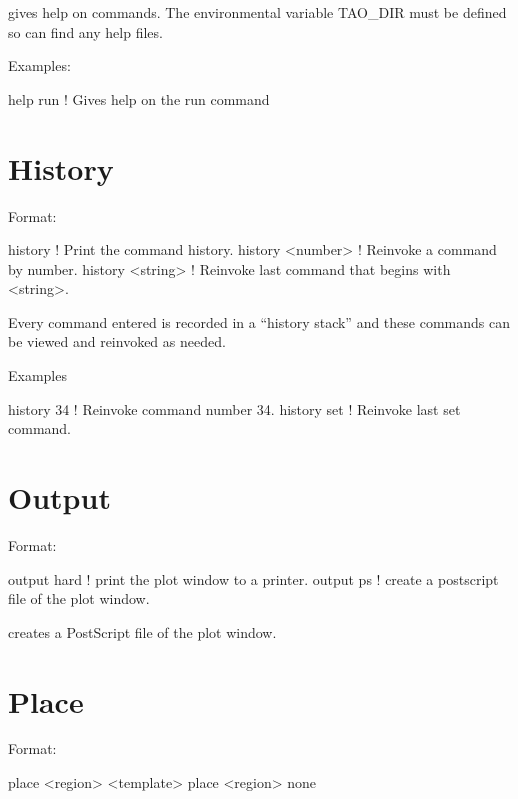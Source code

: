 \vskip 0.2in 
 gives help on \tao commands. The environmental
variable TAO_DIR must be defined so \tao can find any help files.

Examples:
\begin{example}
  help run   ! Gives help on the run command
\end{example}

\section{History}
\label{s:history}

Format:
\begin{example}
  history           ! Print the command history.
  history <number>  ! Reinvoke a command by number.
  history <string>  ! Reinvoke last command that begins with <string>.
\end{example}

\vskip 0.2in
Every \tao command entered is recorded in a ``history stack'' and
these commands can be viewed and reinvoked as needed. 

Examples
\begin{example}
  history 34   ! Reinvoke command number 34.
  history set  ! Reinvoke last set command.  
\end{example}

\section{Output}
\label{s:output}

Format:
\begin{example}
  output hard     ! print the plot window to a printer.
  output ps       ! create a postscript file of the plot window.
\end{example}

\vskip 0.2in
 creates a PostScript file of the plot window. 

\section{Place}
\label{s:place}

Format:
\begin{example}
  place <region> <template>
  place <region> none
\end{example}

